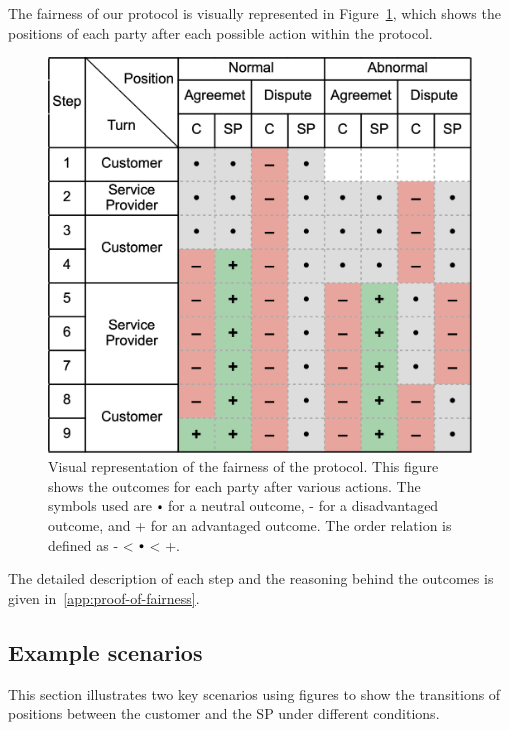 \documentclass[pdftex,twocolumn,epjc3]{svjour3}
\newcommand{\plus}{+}
\newcommand{\minus}{-}
\newcommand\neutral[1][.75]{\mathbin{\ThisStyle{\vcenter{\hbox{%
  \scalebox{#1}{$\SavedStyle\bullet$}}}}}%
}
\begin{document}
The fairness of our protocol is visually represented in Figure~\ref{fig:positions}, which shows the positions of each party after each possible action within the protocol.

\begin{figure}[h!]
\includegraphics[width=\linewidth]{model.png}
\centering
\caption{Visual representation of the fairness of the protocol. This figure shows the outcomes for each party after various actions. The symbols used are $\neutral{}$ for a neutral outcome, \minus{} for a disadvantaged outcome, and \plus{} for an advantaged outcome. The order relation is defined as \minus{} < $\neutral{}$ < \plus{}.}
\label{fig:positions}
\end{figure}

The detailed description of each step and the reasoning behind the outcomes is given in~\ref{app:proof-of-fairness}.

\subsection{Example scenarios}\label{example-scenarios}
This section illustrates two key scenarios using figures to show the transitions of positions between the customer and the SP under different conditions.
\end{document}
